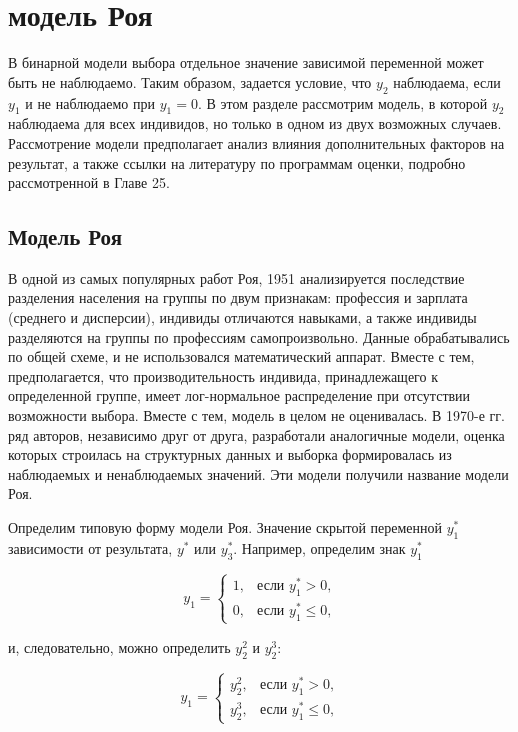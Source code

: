 \section{модель Роя}


В бинарной модели выбора отдельное значение зависимой переменной может быть не наблюдаемо. Таким образом, задается условие, что $y_2$ наблюдаема, если $y_1$ и не наблюдаемо при $y_1=0$. В этом разделе рассмотрим модель, в которой $y_2$ наблюдаема для всех индивидов, но только в одном из двух возможных случаев. Рассмотрение модели предполагает анализ влияния дополнительных факторов на результат, а также ссылки на литературу по программам оценки, подробно рассмотренной в Главе 25. 

\subsection{Модель Роя}

В одной из самых популярных работ Роя, 1951 анализируется последствие разделения населения на группы по двум признакам: профессия и зарплата (среднего и дисперсии), индивиды отличаются навыками, а также индивиды разделяются на группы по профессиям самопроизвольно. Данные обрабатывались по общей схеме, и не использовался математический аппарат. Вместе с тем, предполагается, что производительность индивида, принадлежащего к определенной группе, имеет лог-нормальное распределение при отсутствии возможности выбора. Вместе с тем, модель в целом не оценивалась. В 1970-е гг. ряд авторов, независимо друг от друга, разработали аналогичные модели, оценка которых строилась на структурных данных и выборка формировалась из наблюдаемых и ненаблюдаемых значений. Эти модели получили название модели Роя. 

Определим типовую форму модели Роя. Значение скрытой переменной $y^{*}_1$ зависимости от результата, $y^{*}$ или $y^{*}_3$. Например, определим знак $y_1^{*}$

\begin{equation}
y_1=
\begin{cases}
	1, & \text{если $y_1^{*}>0$,} \\
	0, & \text{если $y_1^{*}\leq0$,}
\end{cases}
\end{equation}

и, следовательно, можно определить $y_2^{2}$ и $y_2^{3}$:

\begin{equation}
y_1=
\begin{cases}
	y_2^{2}, & \text{если $y_1^{*}>0$,} \\
	y_2^{3}, & \text{если $y_1^{*}\leq0$,}
\end{cases}
\end{equation}

